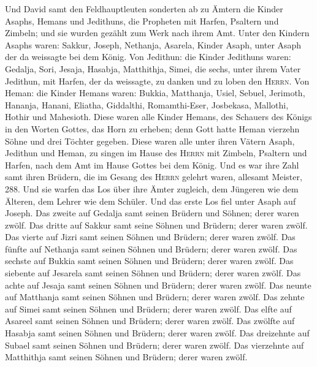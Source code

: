  Und David samt den Feldhauptleuten sonderten ab zu Ämtern
die Kinder Asaphs, Hemans und Jedithuns, die Propheten mit Harfen,
Psaltern und Zimbeln; und sie wurden gezählt zum Werk nach ihrem Amt.
 Unter den Kindern Asaphs waren: Sakkur, Joseph, Nethanja,
Asarela, Kinder Asaph, unter Asaph der da weissagte bei dem König.
 Von Jedithun: die Kinder Jedithuns waren: Gedalja, Sori,
Jesaja, Hasabja, Matthithja, Simei, die sechs, unter ihrem Vater
Jedithun, mit Harfen, der da weissagte, zu danken und zu loben den
\textsc{Herrn}.  Von Heman: die Kinder Hemans waren:
Bukkia, Matthanja, Usiel, Sebuel, Jerimoth, Hananja, Hanani, Eliatha,
Giddalthi, Romamthi-Eser, Josbekasa, Mallothi, Hothir und Mahesioth.
 Diese waren alle Kinder Hemans, des Schauers des Königs
in den Worten Gottes, das Horn zu erheben; denn Gott hatte Heman
vierzehn Söhne und drei Töchter gegeben.  Diese waren alle
unter ihren Vätern Asaph, Jedithun und Heman, zu singen im Hause des
\textsc{Herrn} mit Zimbeln, Psaltern und Harfen, nach dem Amt im Hause
Gottes bei dem König.  Und es war ihre Zahl samt ihren
Brüdern, die im Gesang des \textsc{Herrn} gelehrt waren, allesamt
Meister, 288.  Und sie warfen das Los über ihre Ämter
zugleich, dem Jüngeren wie dem Älteren, dem Lehrer wie dem Schüler.
 Und das erste Los fiel unter Asaph auf Joseph. Das zweite
auf Gedalja samt seinen Brüdern und Söhnen; derer waren zwölf.
 Das dritte auf Sakkur samt seine Söhnen und Brüdern;
derer waren zwölf.  Das vierte auf Jizri samt seinen
Söhnen und Brüdern; derer waren zwölf.  Das fünfte auf
Nethanja samt seinen Söhnen und Brüdern; derer waren zwölf.
 Das sechste auf Bukkia samt seinen Söhnen und Brüdern;
derer waren zwölf.  Das siebente auf Jesarela samt seinen
Söhnen und Brüdern; derer waren zwölf.  Das achte auf
Jesaja samt seinen Söhnen und Brüdern; derer waren zwölf.
 Das neunte auf Matthanja samt seinen Söhnen und Brüdern;
derer waren zwölf.  Das zehnte auf Simei samt seinen
Söhnen und Brüdern; derer waren zwölf.  Das elfte auf
Asareel samt seinen Söhnen und Brüdern; derer waren zwölf.
 Das zwölfte auf Hasabja samt seinen Söhnen und Brüdern;
derer waren zwölf.  Das dreizehnte auf Subael samt seinen
Söhnen und Brüdern; derer waren zwölf.  Das vierzehnte
auf Matthithja samt seinen Söhnen und Brüdern; derer waren zwölf.
